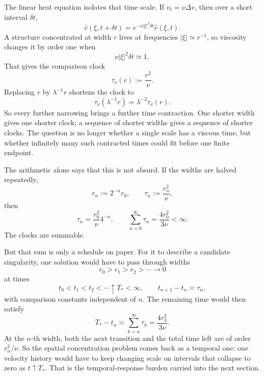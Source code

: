 The linear heat equation isolates that time scale. If \(v_t=\nu\Delta v\), then over a short interval \(\delta t\),
\[
  \widehat v(\xi,t+\delta t)
  =
  e^{-\nu|\xi|^2\delta t}\widehat v(\xi,t).
\]
A structure concentrated at width \(r\) lives at frequencies \(|\xi|\simeq r^{-1}\), so viscosity changes it by order one when
\[
  \nu|\xi|^2\delta t\simeq1,
\]
That gives the comparison clock
\[
  \tau_\nu(r)
  :=
  \frac{r^2}{\nu}.
\]
Replacing \(r\) by \(\lambda^{-1}r\) shortens the clock to
\[
  \tau_\nu(\lambda^{-1}r)
  =
  \lambda^{-2}\tau_\nu(r).
\]
So every further narrowing brings a further time contraction. One shorter width gives one shorter clock; a sequence of shorter widths gives a sequence of shorter clocks. The question is no longer whether a single scale has a viscous time, but whether infinitely many such contracted times could fit before one finite endpoint.


The arithmetic alone says that this is not absurd. If the widths are halved repeatedly,
\[
  r_n:=2^{-n}r_0,
  \qquad
  \tau_n:=\frac{r_n^2}{\nu},
\]
then
\[
  \tau_n
  =
  \frac{r_0^2}{\nu}4^{-n},
  \qquad
  \sum_{n=0}^{\infty}\tau_n
  =
  \frac{4r_0^2}{3\nu}
  <
  \infty.
\]
The clocks are summable.

But that sum is only a schedule on paper. For it to describe a candidate singularity, one \NavierStokes{} solution would have to pass through widths
\[
  r_0>r_1>r_2>\cdots\longrightarrow0
\]
at times
\[
  t_0<t_1<t_2<\cdots\uparrow T_*<\infty,
  \qquad
  t_{n+1}-t_n\asymp\tau_n,
\]
with comparison constants independent of \(n\). The remaining time would then satisfy
\[
  T_*-t_n
  \asymp
  \sum_{k=n}^{\infty}\tau_k
  =
  \frac{4r_n^2}{3\nu}.
\]
At the \(n\)-th width, both the next transition and the total time left are of order \(r_n^2/\nu\). So the spatial concentration problem comes back as a temporal one: one velocity history would have to keep changing scale on intervals that collapse to zero as \(t\uparrow T_*\). That is the temporal-response burden carried into the next section.
